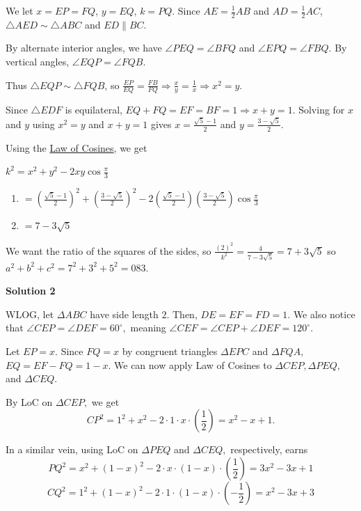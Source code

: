 \begin{enumerate}
 We let $x = EP = FQ$, $y = EQ$, $k = PQ$. Since $AE = \frac {1}{2}AB$ and $AD = \frac {1}{2}AC$, $\triangle AED \sim \triangle ABC$ and $ED \parallel BC$.

 By alternate interior angles, we have $\angle PEQ = \angle BFQ$ and $\angle EPQ = \angle FBQ$. By vertical angles, $\angle EQP = \angle FQB$. 

 Thus $\triangle EQP \sim \triangle FQB$, so $\frac {EP}{EQ} = \frac {FB}{FQ}\Longrightarrow\frac {x}{y} = \frac {1}{x}\Longrightarrow x^{2} = y$.

 Since $\triangle EDF$ is equilateral, $EQ + FQ = EF = BF = 1\Longrightarrow x + y = 1$. Solving for $x$ and $y$ using $x^{2} = y$ and $x + y = 1$ gives $x = \frac {\sqrt {5} - 1}{2}$ and $y = \frac {3 - \sqrt {5}}{2}$.

 Using the \href{https://artofproblemsolving.com/wiki/index.php?title=Law\_of\_Cosines}{Law of Cosines}, we get

 $k^{2}  =  x^{2} + y^{2} - 2xy\cos{\frac {\pi}{3}}$ 
            \begin{enumerate}[label=(\roman*)]
                \item $=  \left(\frac {\sqrt {5} - 1}{2}\right)^{2} + \left(\frac {3 - \sqrt {5}}{2}\right)^{2} - 2\left(\frac {\sqrt {5} - 1}{2}\right)\left(\frac {3 - \sqrt {5}}{2}\right)\cos{\frac {\pi}{3}}$\item $= 7 - 3\sqrt {5}$
            \end{enumerate}
            We want the ratio of the squares of the sides, so $\frac {(2)^{2}}{k^{2}} = \frac {4}{7 - 3\sqrt {5}} = 7 + 3\sqrt {5}$ so $a^{2} + b^{2} + c^{2} = 7^{2} + 3^{2} + 5^{2} = \boxed{083}$.

 



\textbf{Solution 2}

WLOG, let $\Delta ABC$ have side length $2.$ Then, $DE = EF = FD = 1.$ We also notice that $\angle CEP = \angle DEF = 60^{\circ},$ meaning $\angle CEF = \angle CEP + \angle DEF = 120^{\circ}.$

 Let $EP = x.$ Since $FQ = x$ by congruent triangles $\Delta EPC$ and $\Delta FQA,$ $EQ = EF - FQ = 1-x.$ We can now apply Law of Cosines to $\Delta CEP, \Delta PEQ,$ and $\Delta CEQ.$

 By LoC on $\Delta CEP,$ we get 
 \[CP^2 = 1^2 + x^2 - 2\cdot 1\cdot x\cdot \left(\frac{1}{2}\right) = x^2 - x + 1.\]

 In a similar vein, using LoC on $\Delta PEQ$ and $\Delta CEQ,$ respectively, earns 
 \[PQ^2 = x^2 + (1-x)^2 - 2\cdot x\cdot (1-x)\cdot \left(\frac{1}{2}\right) = 3x^2 - 3x + 1\] 
 \[CQ^2 = 1^2 + (1-x)^2 - 2\cdot 1\cdot (1-x)\cdot \left(-\frac{1}{2}\right) = x^2 - 3x + 3\]


\end{enumerate}
